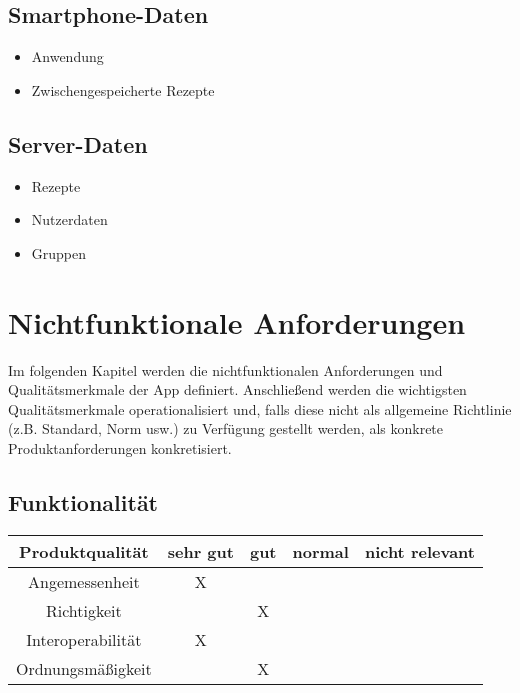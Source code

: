 \documentclass[parskip=full]{scrartcl}
\newcommand{\changelocaltocdepth}[1]{%
  \addtocontents{toc}{\protect\setcounter{tocdepth}{#1}}%
  \setcounter{tocdepth}{#1}%
}
\newcommand{\resetsubsectionnumbering}{
    \renewcommand{\thesubsection}{\arabic{section}.\arabic{subsection}}
    \changelocaltocdepth{3} 
}
\begin{document}
\subsection{Smartphone-Daten}
\begin{itemize}
    \item Anwendung
    \item Zwischengespeicherte Rezepte
\end{itemize}

\subsection{Server-Daten}
\begin{itemize}
    \item Rezepte
    \item Nutzerdaten
    \item Gruppen
\end{itemize}

\resetsubsectionnumbering
\section{Nichtfunktionale Anforderungen}
Im folgenden Kapitel werden die nichtfunktionalen Anforderungen und Qualitätsmerkmale der App definiert.
Anschließend werden die wichtigsten Qualitätsmerkmale operationalisiert und, falls diese nicht als allgemeine Richtlinie (z.B. Standard, Norm usw.) zu Verfügung gestellt werden,
als konkrete Produktanforderungen konkretisiert.

\subsection{Funktionalität}
\begin{tabular}{| c | c | c | c | c |}
    \hline
    \textbf{ Produktqualität } & \textbf{sehr gut} & \textbf{gut} & \textbf{normal} & \textbf{nicht relevant} \\ \hline
    Angemessenheit             & X                 &              &                 &                         \\ \hline
    Richtigkeit                &                   & X            &                 &                         \\ \hline
    Interoperabilität          & X                 &              &                 &                         \\ \hline
    Ordnungsmäßigkeit          &                   & X            &                 &                         \\ \hline
\end{tabular}
\end{document}
